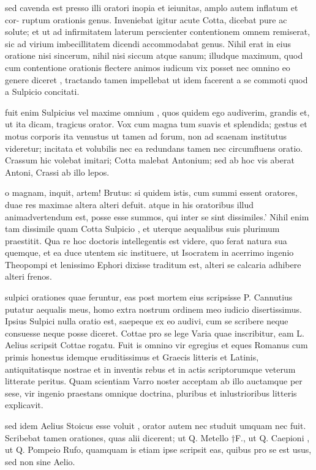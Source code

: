  sed cavenda est presso illi oratori inopia et ieiunitas, amplo autem inflatum et cor- ruptum orationis genus. Inveniebat igitur acute Cotta, dicebat pure ac solute; et ut ad infirmitatem laterum perscienter contentionem omnem remiserat, sic ad virium imbecillitatem dicendi accommodabat genus. Nihil erat in eius oratione nisi sincerum, nihil nisi siccum atque sanum; illudque maximum, quod cum contentione orationis flectere animos iudicum vix posset nec omnino eo genere diceret , tractando tamen impellebat ut idem facerent a se commoti quod a Sulpicio concitati.

 fuit enim Sulpicius vel maxime omnium , quos quidem ego audiverim, grandis et, ut ita dicam, tragicus orator. Vox cum magna tum suavis et splendida; gestus et motus corporis ita venustus ut tamen ad forum, non ad scaenam institutus videretur; incitata et volubilis nec ea redundans tamen nec circumfluens oratio. Crassum hic volebat imitari; Cotta malebat Antonium; sed ab hoc vis aberat Antoni, Crassi ab illo lepos.

 o magnam, inquit, artem! Brutus: si quidem istis, cum summi essent oratores, duae res maximae altera alteri defuit. atque in his oratoribus illud animadvertendum est, posse esse summos, qui inter se sint dissimiles.' Nihil enim tam dissimile quam Cotta Sulpicio , et uterque aequalibus suis plurimum praestitit. Qua re hoc doctoris intellegentis est videre, quo ferat natura sua quemque, et ea duce utentem sic instituere, ut Isocratem in acerrimo ingenio Theopompi et lenissimo Ephori dixisse traditum est, alteri se calcaria adhibere alteri frenos.

 sulpici orationes quae feruntur, eas post mortem eius scripsisse P. Cannutius putatur aequalis meus, homo extra nostrum ordinem meo iudicio disertissimus. Ipsius Sulpici nulla oratio est, saepeque ex eo audivi, cum se scribere neque consuesse neque posse diceret. Cottae pro se lege Varia quae inscribitur, eam L. Aelius scripsit Cottae rogatu. Fuit is omnino vir egregius et eques Romanus cum primis honestus idemque eruditissimus et Graecis litteris et Latinis, antiquitatisque nostrae et in inventis rebus et in actis scriptorumque veterum litterate peritus. Quam scientiam Varro noster acceptam ab illo auctamque per sese, vir ingenio praestans omnique doctrina, pluribus et inlustrioribus litteris explicavit.

 sed idem Aelius Stoicus esse voluit , orator autem nec studuit umquam nec fuit. Scribebat tamen orationes, quas alii dicerent; ut Q. Metello †F., ut Q. Caepioni , ut Q. Pompeio Rufo, quamquam is etiam ipse scripsit eas, quibus pro se est usus, sed non sine Aelio.

